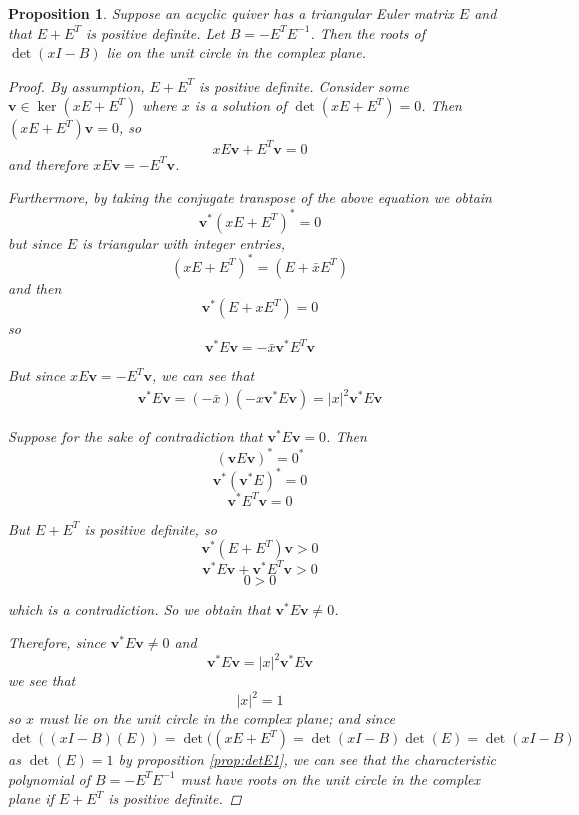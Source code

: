 \documentclass{amsart}
\newcommand*\conj[1]{\bar{#1}}
\theoremstyle{theorem}
\theoremstyle{theorem*}
\newtheorem{proposition}[theorem]{Proposition}
\theoremstyle{definition}
\begin{document}
\begin{proposition} Suppose an acyclic quiver has a
    triangular Euler matrix $E$ and that $E + E^T$ is positive definite.
    Let $B = -E^T E^{-1}$.
    Then the roots of $\det(xI - B)$ lie on the unit circle in the
    complex plane.
    \begin{proof}
        By assumption, $E + E^T$ is positive
        definite. Consider some $\textbf{v} \in \ker(xE + E^T)$
        where $x$ is a solution of $\det(xE+E^T) = 0$.
        Then $(xE + E^T) \textbf{v} = 0$, so
        $$x E \textbf{v} + E^T \textbf{v} = 0$$
        and therefore $x E \textbf{v} = - E^T \textbf{v}$.

        Furthermore, by taking the conjugate transpose of the above equation we obtain
        $$\textbf{v}^* (xE + E^T)^* = 0$$
        but since $E$ is triangular with integer entries,
        $$(xE + E^T)^* = (E + \conj{x} E^T)$$
        and then
        $$\textbf{v}^*(E + xE^T) = 0$$
        so
        $$\textbf{v}^* E \textbf{v} = - \conj{x} \textbf{v}^* E^T \textbf{v}$$

        But since $x E \textbf{v} = - E^T \textbf{v}$, we can see that
        \begin{align*}
            \textbf{v}^* E \textbf{v} = (- \conj{x})(-x \textbf{v}^* E \textbf{v})
            = |x|^2 \textbf{v}^* E \textbf{v}
        \end{align*}


        Suppose for the sake of contradiction that $\textbf{v}^* E \textbf{v} = 0$.
        Then
        $$(\textbf{v} E \textbf{v})^* = 0^*$$
        $$\textbf{v}^* (\textbf{v}^* E)^* = 0$$
        $$\textbf{v}^* E^T \textbf{v} = 0$$

        But $E + E^T$ is positive definite, so
        $$\textbf{v}^* (E + E^T) \textbf{v} > 0$$
        $$\textbf{v}^* E \textbf{v} + \textbf{v}^* E^T \textbf{v} > 0$$
        $$0 > 0$$

        which is a contradiction. So we obtain that
        $\textbf{v}^* E \textbf{v} \neq 0$.

        Therefore, since $\textbf{v}^* E \textbf{v} \neq 0$ and
        $$\textbf{v}^* E \textbf{v} = |x|^2 \textbf{v}^* E \textbf{v}$$
        we see that
        $$|x|^2 = 1$$
        so $x$ must lie on the unit circle in the complex plane; and since
        $$\det((xI - B)(E)) = \det((xE + E^T) =
            \det(xI - B)\det(E) = \det(xI - B)$$
        as $\det(E) = 1$ by proposition \ref{prop:detE1},
        we can see that the characteristic polynomial
        of $B = -E^T E^{-1}$ must have roots on the unit circle
        in the complex plane if $E + E^T$ is positive definite.
    \end{proof}
\end{proposition}
\end{document}
